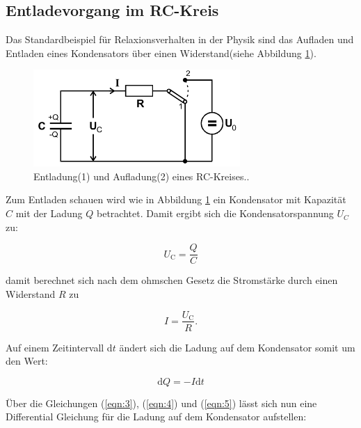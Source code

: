     \subsection{Entladevorgang im RC-Kreis}

        \noindent Das Standardbeispiel für Relaxionsverhalten in der Physik sind das Aufladen und Entladen eines Kondensators über einen 
        Widerstand(siehe Abbildung \ref{img:A_und_e}).

        \begin{figure}
            \centering
            \includegraphics[width=0.70\textwidth]{latex/images/Auflade_und_entlade.PNG}
            \caption{Entladung(1) und Aufladung(2) eines RC-Kreises.\protect \cite{V353}.}
            \label{img:A_und_e}
        \end{figure}

        \noindent Zum Entladen schauen wird wie in Abbildung \ref{img:A_und_e} ein Kondensator mit Kapazität $C$ mit der Ladung $Q$ betrachtet.
        Damit ergibt sich die Kondensatorspannung $U_C$ zu:

        \begin{equation}
            U_{\text{C}} = \frac{Q}{C}
            \label{eqn:3}
        \end{equation}

        \noindent damit berechnet sich nach dem ohmschen Gesetz die Stromstärke durch einen Widerstand $R$ zu

        \begin{equation}
            I = \frac{U_{\text{C}}}{R} .
            \label{eqn:4}
        \end{equation}

        \noindent Auf einem Zeitintervall d$t$ ändert sich die Ladung auf dem Kondensator somit um den Wert:

        \begin{equation}
            \text{d}Q = -I \text{d}t
            \label{eqn:5}
        \end{equation}

        \noindent Über die Gleichungen (\ref{eqn:3}), (\ref{eqn:4}) und (\ref{eqn:5}) lässt sich nun eine Differential Gleichung für die 
        Ladung auf dem Kondensator aufstellen:

